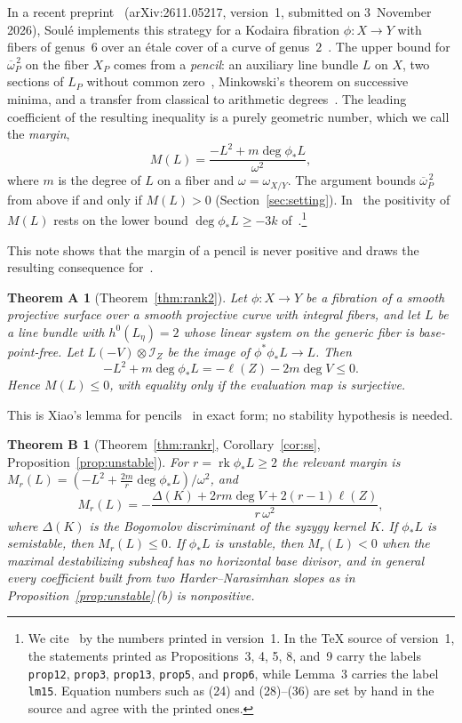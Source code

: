 \documentclass[11pt]{article}
\newtheorem*{theoremA}{Theorem A}
\newtheorem*{theoremB}{Theorem B}
\theoremstyle{definition}
\theoremstyle{remark}
\DeclareMathOperator{\rk}{rk}
\newcommand{\cI}{\mathcal{I}}
\newcommand{\ob}{\overline{\omega}}
\begin{document}
In a recent preprint~\cite{So26} (arXiv:2611.05217, version~1, submitted on
3~November 2026), Soul\'e implements this strategy for a Kodaira fibration
$\phi\colon X\to Y$ with fibers of genus~$6$ over an \'etale cover of a curve of
genus~$2$~\cite{Ko67,MD85}. The upper bound for $\ob_P^{\,2}$ on the fiber $X_P$
comes from a \emph{pencil}: an auxiliary line bundle $L$ on $X$, two sections of
$L_P$ without common zero~\cite[Prop.~3]{So26}, Minkowski's theorem on successive
minima, and a transfer from classical to arithmetic degrees~\cite[Cor.~1]{So26}.
The leading coefficient of the resulting inequality is a purely geometric number,
which we call the \emph{margin},
\begin{equation}\label{eq:margin-intro}
M(L)=\frac{-L^2+m\deg\phi_*L}{\omega^2},
\end{equation}
where $m$ is the degree of $L$ on a fiber and $\omega=\omega_{X/Y}$. The argument
bounds $\ob_P^{\,2}$ from above if and only if $M(L)>0$ (Section~\ref{sec:setting}).
In~\cite{So26} the positivity of $M(L)$ rests on the lower bound
$\deg\phi_*L\ge -3k$ of~\cite[Prop.~9\,vi)]{So26}.\footnote{We cite~\cite{So26}
by the numbers printed in version~1. In the \TeX{} source of version~1, the
statements printed as Propositions~3, 4, 5, 8, and~9 carry the labels
\texttt{prop12}, \texttt{prop3}, \texttt{prop13}, \texttt{prop5}, and
\texttt{prop6}, while Lemma~3 carries the label \texttt{lm15}. Equation numbers
such as (24) and (28)--(36) are set by hand in the source and agree with the
printed ones.}

This note shows that the margin of a pencil is never positive and draws the
resulting consequence for~\cite{So26}.

\begin{theoremA}[Theorem~\ref{thm:rank2}]
Let $\phi\colon X\to Y$ be a fibration of a smooth projective surface over a
smooth projective curve with integral fibers, and let $L$ be a line bundle with
$h^0(L_\eta)=2$ whose linear system on the generic fiber is base-point-free. Let
$L(-V)\otimes\cI_Z$ be the image of $\phi^*\phi_*L\to L$. Then
\[
-L^2+m\deg\phi_*L=-\ell(Z)-2m\deg V\le 0 .
\]
Hence $M(L)\le 0$, with equality only if the evaluation map is surjective.
\end{theoremA}

This is Xiao's lemma for pencils~\cite{Xi87} in exact form; no stability
hypothesis is needed.

\begin{theoremB}[Theorem~\ref{thm:rankr}, Corollary~\ref{cor:ss}, Proposition~\ref{prop:unstable}]
For $r=\rk\phi_*L\ge 2$ the relevant margin is
$M_r(L)=(-L^2+\tfrac{2m}{r}\deg\phi_*L)/\omega^2$, and
\[
M_r(L)=-\frac{\Delta(K)+2rm\deg V+2(r-1)\ell(Z)}{r\,\omega^2},
\]
where $\Delta(K)$ is the Bogomolov discriminant of the syzygy kernel $K$. If
$\phi_*L$ is semistable, then $M_r(L)\le 0$. If $\phi_*L$ is unstable, then
$M_r(L)<0$ when the maximal destabilizing subsheaf has no horizontal base divisor,
and in general every coefficient built from two Harder--Narasimhan slopes as in
Proposition~\ref{prop:unstable}\,(b) is nonpositive.
\end{theoremB}
\end{document}
